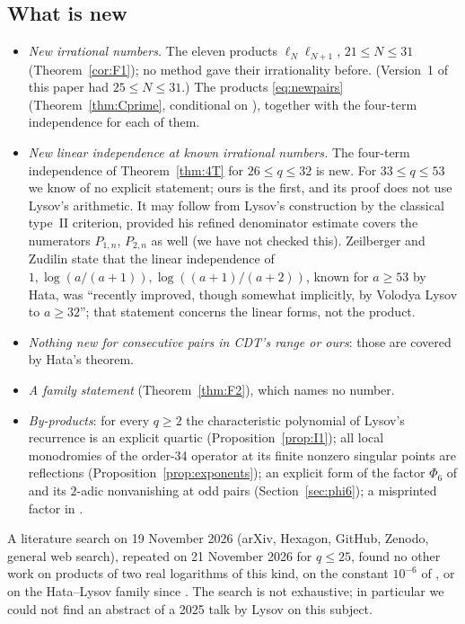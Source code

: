 \documentclass[11pt]{amsart}
\theoremstyle{definition}
\theoremstyle{remark}
\numberwithin{equation}{section}
\begin{document}
\subsection{What is new}
\begin{itemize}
\item \emph{New irrational numbers.} The eleven products $\ell_N\ell_{N+1}$, $21\le N\le31$ (Theorem~\ref{cor:F1});
no method gave their irrationality before. (Version~1 of this paper had $25\le N\le31$.) The products \eqref{eq:newpairs} (Theorem~\ref{thm:Cprime}, conditional on
\cite[\S14]{CDT}), together with the four-term independence for each of them.
\item \emph{New linear independence at known irrational numbers.} The four-term independence of
Theorem~\ref{thm:4T} for $26\le q\le32$ is new. For $33\le q\le53$ we know of no explicit statement; ours is the first,
and its proof does not use Lysov's arithmetic. It may follow from Lysov's construction by the classical type~II
criterion, provided his refined denominator estimate covers the numerators $P_{1,n}$, $P_{2,n}$ as well (we have not
checked this). Zeilberger and Zudilin \cite[p.~8]{ZZ19} state that the linear independence of
$1,\log(a/(a+1)),\log((a+1)/(a+2))$, known for $a\ge53$ by Hata, was ``recently improved, though somewhat implicitly,
by Volodya Lysov to $a\ge32$''; that statement concerns the linear forms, not the product.
\item \emph{Nothing new for consecutive pairs in CDT's range or ours}: those are covered by Hata's theorem.
\item \emph{A family statement} (Theorem~\ref{thm:F2}), which names no number.
\item \emph{By-products}: for every $q\ge2$ the characteristic polynomial of Lysov's recurrence is an explicit quartic
(Proposition~\ref{prop:I1}); all local monodromies of the order-34 operator at its finite nonzero singular points are
reflections (Proposition~\ref{prop:exponents}); an explicit form of the factor $\Phi_6$ of \cite[Lemma~14.3.1]{CDT}
and its $2$-adic nonvanishing at odd pairs (Section~\ref{sec:phi6}); a misprinted factor in \cite[(14.2.2), (14.2.3)]{CDT}.
\end{itemize}
A literature search on 19 November 2026 (arXiv, Hexagon, GitHub, Zenodo, general web search), repeated on 21 November
2026 for $q\le25$, found no other work on products of two real logarithms of this kind, on the constant $10^{-6}$ of
\cite[Thm.~C]{CDT}, or on the Hata--Lysov family since \cite{Lys18}. The search is not exhaustive; in particular we could not find an abstract of a
2025 talk by Lysov on this subject.
\end{document}
